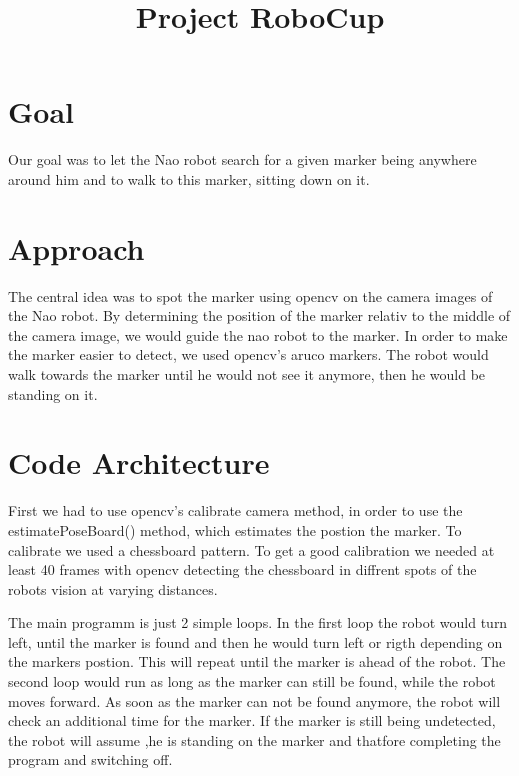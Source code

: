 \documentclass{article}
\title{Project RoboCup}
\begin{document}
\maketitle

\tableofcontents

\section{Goal}
Our goal was to let the Nao robot search for a given marker being anywhere around him and to walk to this marker, sitting down on it.

\section{Approach}
The central idea was to spot the marker using opencv on the camera images of the Nao robot. By determining the position of the marker relativ to the middle of the camera image, we would guide the nao robot to the marker. In order to make the marker easier to detect, we used opencv's aruco markers. The robot would walk towards the marker until he would not see it anymore, then he would be standing on it.

\section{Code Architecture}
First we had to use opencv's calibrate camera method, in order to use the estimatePoseBoard() method, which estimates the postion the marker. To calibrate we used a chessboard pattern. To get a good calibration we needed at least 40 frames with opencv detecting the chessboard in diffrent spots of the robots vision at varying distances.

The main programm is just 2 simple loops. In the first loop the robot would turn left, until the marker is found and then he would turn left or rigth depending on the markers postion. This will repeat until the marker is ahead of the robot. The second loop would run as long as the marker can still be found, while the robot moves forward. As soon as the marker can not be found anymore, the robot will check an additional time for the marker. If the marker is still being undetected, the robot will assume ,he is standing on the marker and thatfore completing the program and switching off.
\end{document}
